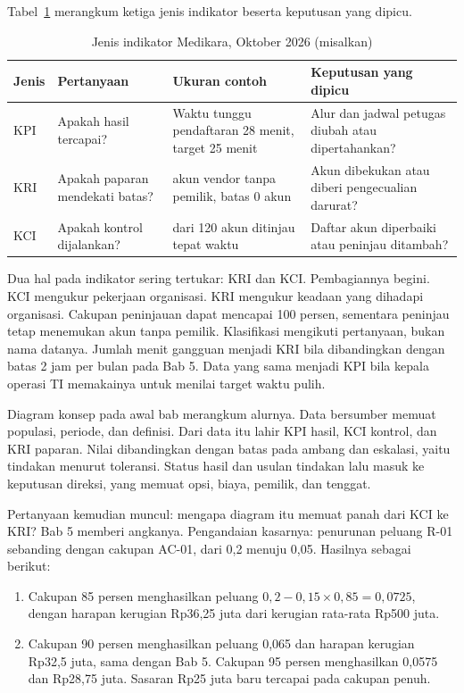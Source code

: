 Tabel~\ref{tab:ch13-jenis-indikator} merangkum ketiga jenis indikator beserta keputusan yang
dipicu.

\begin{table}[!htb]
  \centering\small
  \caption{Jenis indikator Medikara, Oktober 2026 (misalkan)}\label{tab:ch13-jenis-indikator}
  \begin{tabularx}{\textwidth}{|>{\raggedright\arraybackslash}p{}|>{\raggedright\arraybackslash}p{}|>{\raggedright\arraybackslash}X|>{\raggedright\arraybackslash}X|}
    \hline
    \textbf{Jenis} & \textbf{Pertanyaan} & \textbf{Ukuran contoh} & \textbf{Keputusan yang dipicu}
    \\ \hline
    KPI & Apakah hasil tercapai? & Waktu tunggu pendaftaran 28 menit, target 25 menit & Alur dan
    jadwal petugas diubah atau dipertahankan? \\ \hline
    KRI & Apakah paparan mendekati batas? & 1 akun vendor tanpa pemilik, batas 0 akun & Akun
    dibekukan atau diberi pengecualian darurat? \\ \hline
    KCI & Apakah kontrol dijalankan? & 114 dari 120 akun ditinjau tepat waktu & Daftar akun
    diperbaiki atau peninjau ditambah? \\ \hline
  \end{tabularx}
\end{table}

Dua hal pada indikator sering tertukar: KRI dan KCI. Pembagiannya begini. KCI mengukur pekerjaan
organisasi. KRI mengukur keadaan yang dihadapi organisasi. Cakupan peninjauan dapat mencapai 100
persen, sementara peninjau tetap menemukan akun tanpa pemilik. Klasifikasi mengikuti pertanyaan,
bukan nama datanya. Jumlah menit gangguan menjadi KRI bila dibandingkan dengan batas 2 jam per
bulan pada Bab 5. Data yang sama menjadi KPI bila kepala operasi TI memakainya untuk menilai
target waktu pulih.

Diagram konsep pada awal bab merangkum alurnya. Data bersumber memuat populasi, periode, dan
definisi. Dari data itu lahir KPI hasil, KCI kontrol, dan KRI paparan. Nilai dibandingkan dengan
batas pada ambang dan eskalasi, yaitu tindakan menurut toleransi. Status hasil dan usulan tindakan
lalu masuk ke keputusan direksi, yang memuat opsi, biaya, pemilik, dan tenggat.

Pertanyaan kemudian muncul: mengapa diagram itu memuat panah dari KCI ke KRI? Bab 5 memberi
angkanya. Pengandaian kasarnya: penurunan peluang R-01 sebanding dengan cakupan AC-01, dari 0,2
menuju 0,05. Hasilnya sebagai berikut:
\begin{enumerate}
  \item Cakupan 85 persen menghasilkan peluang $0{,}2 - 0{,}15 \times 0{,}85 = 0{,}0725$, dengan
  harapan kerugian Rp36,25 juta dari kerugian rata-rata Rp500 juta.
  \item Cakupan 90 persen menghasilkan peluang 0,065 dan harapan kerugian Rp32,5 juta, sama dengan
  Bab 5. Cakupan 95 persen menghasilkan 0,0575 dan Rp28,75 juta. Sasaran Rp25 juta baru tercapai
  pada cakupan penuh.
\end{enumerate}


